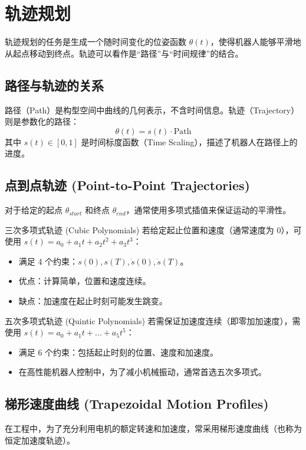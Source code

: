 \chapter{轨迹规划}

轨迹规划的任务是生成一个随时间变化的位姿函数 $\theta(t)$，使得机器人能够平滑地从起点移动到终点。轨迹可以看作是“路径”与“时间规律”的结合。

\section{ 路径与轨迹的关系}
路径（Path）是构型空间中曲线的几何表示，不含时间信息。轨迹（Trajectory）则是参数化的路径：
\begin{equation}
    \theta(t) = s(t) \cdot \text{Path}
\end{equation}
其中 $s(t) \in [0, 1]$ 是时间标度函数（Time Scaling），描述了机器人在路径上的进度。

\section{点到点轨迹 (Point-to-Point Trajectories)}
对于给定的起点 $\theta_{start}$ 和终点 $\theta_{end}$，通常使用多项式插值来保证运动的平滑性。



\begin{mybox}{三次多项式轨迹 (Cubic Polynomials)}
若给定起止位置和速度（通常速度为 0），可使用 $s(t) = a_0 + a_1 t + a_2 t^2 + a_3 t^3$：
\begin{itemize}
    \item 满足 4 个约束：$s(0), s(T), \dot{s}(0), \dot{s}(T)$。
    \item 优点：计算简单，位置和速度连续。
    \item 缺点：加速度在起止时刻可能发生跳变。
\end{itemize}
\end{mybox}

\begin{mybox}{五次多项式轨迹 (Quintic Polynomials)}
若需保证加速度连续（即零加加速度），需使用 $s(t) = a_0 + a_1 t + \dots + a_5 t^5$：
\begin{itemize}
    \item 满足 6 个约束：包括起止时刻的位置、速度和加速度。
    \item 在高性能机器人控制中，为了减小机械振动，通常首选五次多项式。
\end{itemize}
\end{mybox}

\section{梯形速度曲线 (Trapezoidal Motion Profiles)}
在工程中，为了充分利用电机的额定转速和加速度，常采用梯形速度曲线（也称为恒定加速度轨迹）。



